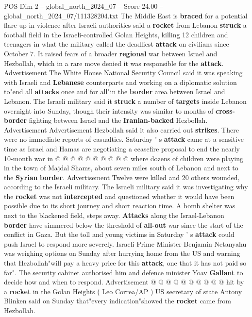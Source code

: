 \begin{textsample}{POS Dim 2 – global\_north\_2024\_07 – Score 24.00 – global\_north\_2024\_07/111328204.txt}  \label{ex:f2_pos_190}
The Middle East is \textbf{braced} for a potential flare-up in violence after Israeli authorities said a \textbf{rocket} from Lebanon \textbf{struck} a football field in the Israeli-controlled Golan Heights, killing 12 children and teenagers in what the military called the deadliest \textbf{attack} on civilians since October 7.
It raised fears of a broader \textbf{regional} war between Israel and Hezbollah, which in a rare move denied it was responsible for the \textbf{attack}.
Advertisement The White House National Security Council said it was speaking with Israeli and \textbf{Lebanese} counterparts and working on a diplomatic solution to"end all \textbf{attacks} once and for all"in the \textbf{border} area between Israel and Lebanon.
The Israeli military said it \textbf{struck} a number of \textbf{targets} inside Lebanon overnight into Sunday, though their intensity was similar to months of \textbf{cross-border} fighting between Israel and the \textbf{Iranian-backed} Hezbollah.
Advertisement Advertisement Hezbollah said it also carried out \textbf{strikes}.
There were no immediate reports of casualties.
Saturday ' s \textbf{attack} came at a sensitive time as Israel and Hamas are negotiating a ceasefire proposal to end the nearly 10-month war in @ @ @ @ @ @ @ @ @ @ where dozens of children were playing in the town of Majdal Shams, about seven miles south of Lebanon and next to the \textbf{Syrian} \textbf{border}.
Advertisement Twelve were killed and 20 others wounded, according to the Israeli military.
The Israeli military said it was investigating why the \textbf{rocket} was not \textbf{intercepted} and questioned whether it would have been possible due to its short journey and short reaction time.
A bomb shelter was next to the blackened field, steps away. \textbf{Attacks} along the Israel-Lebanon \textbf{border} have simmered below the threshold of \textbf{all-out} war since the start of the conflict in Gaza.
But the toll and young victims in Saturday ' s \textbf{attack} could push Israel to respond more severely.
Israeli Prime Minister Benjamin Netanyahu was weighing options on Sunday after hurrying home from the US and warning that Hezbollah"will pay a heavy price for this \textbf{attack}, one that it has not paid so far".
The security cabinet authorised him and defence minister Yoav \textbf{Gallant} to decide how and when to respond.
Advertisement @ @ @ @ @ @ @ @ @ @ hit by a \textbf{rocket} in the Golan Heights ( Leo Correa/AP ) US secretary of state Antony Blinken said on Sunday that"every indication"showed the \textbf{rocket} came from Hezbollah.

\end{textsample}
